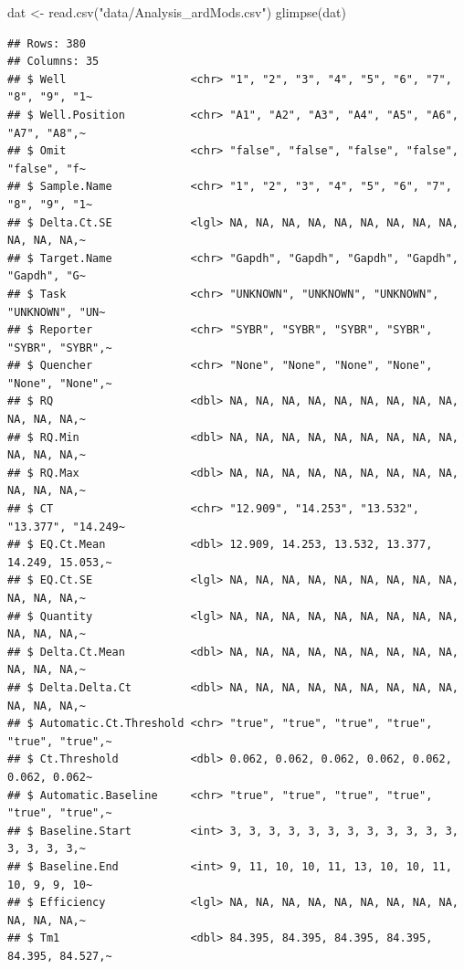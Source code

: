 \documentclass[
]{book}
\newenvironment{Shaded}{\begin{snugshade}}{\end{snugshade}}
\newcommand{\FunctionTok}[1]{\textcolor[rgb]{0.00,0.00,0.00}{#1}}
\newcommand{\NormalTok}[1]{#1}
\newcommand{\OtherTok}[1]{\textcolor[rgb]{0.56,0.35,0.01}{#1}}
\newcommand{\StringTok}[1]{\textcolor[rgb]{0.31,0.60,0.02}{#1}}
\begin{document}
\begin{Shaded}
\begin{Highlighting}[]
\NormalTok{dat }\OtherTok{\textless{}{-}} \FunctionTok{read.csv}\NormalTok{(}\StringTok{"data/Analysis\_ardMods.csv"}\NormalTok{)}
\FunctionTok{glimpse}\NormalTok{(dat)}
\end{Highlighting}
\end{Shaded}

\begin{verbatim}
## Rows: 380
## Columns: 35
## $ Well                   <chr> "1", "2", "3", "4", "5", "6", "7", "8", "9", "1~
## $ Well.Position          <chr> "A1", "A2", "A3", "A4", "A5", "A6", "A7", "A8",~
## $ Omit                   <chr> "false", "false", "false", "false", "false", "f~
## $ Sample.Name            <chr> "1", "2", "3", "4", "5", "6", "7", "8", "9", "1~
## $ Delta.Ct.SE            <lgl> NA, NA, NA, NA, NA, NA, NA, NA, NA, NA, NA, NA,~
## $ Target.Name            <chr> "Gapdh", "Gapdh", "Gapdh", "Gapdh", "Gapdh", "G~
## $ Task                   <chr> "UNKNOWN", "UNKNOWN", "UNKNOWN", "UNKNOWN", "UN~
## $ Reporter               <chr> "SYBR", "SYBR", "SYBR", "SYBR", "SYBR", "SYBR",~
## $ Quencher               <chr> "None", "None", "None", "None", "None", "None",~
## $ RQ                     <dbl> NA, NA, NA, NA, NA, NA, NA, NA, NA, NA, NA, NA,~
## $ RQ.Min                 <dbl> NA, NA, NA, NA, NA, NA, NA, NA, NA, NA, NA, NA,~
## $ RQ.Max                 <dbl> NA, NA, NA, NA, NA, NA, NA, NA, NA, NA, NA, NA,~
## $ CT                     <chr> "12.909", "14.253", "13.532", "13.377", "14.249~
## $ EQ.Ct.Mean             <dbl> 12.909, 14.253, 13.532, 13.377, 14.249, 15.053,~
## $ EQ.Ct.SE               <lgl> NA, NA, NA, NA, NA, NA, NA, NA, NA, NA, NA, NA,~
## $ Quantity               <lgl> NA, NA, NA, NA, NA, NA, NA, NA, NA, NA, NA, NA,~
## $ Delta.Ct.Mean          <dbl> NA, NA, NA, NA, NA, NA, NA, NA, NA, NA, NA, NA,~
## $ Delta.Delta.Ct         <dbl> NA, NA, NA, NA, NA, NA, NA, NA, NA, NA, NA, NA,~
## $ Automatic.Ct.Threshold <chr> "true", "true", "true", "true", "true", "true",~
## $ Ct.Threshold           <dbl> 0.062, 0.062, 0.062, 0.062, 0.062, 0.062, 0.062~
## $ Automatic.Baseline     <chr> "true", "true", "true", "true", "true", "true",~
## $ Baseline.Start         <int> 3, 3, 3, 3, 3, 3, 3, 3, 3, 3, 3, 3, 3, 3, 3, 3,~
## $ Baseline.End           <int> 9, 11, 10, 10, 11, 13, 10, 10, 11, 10, 9, 9, 10~
## $ Efficiency             <lgl> NA, NA, NA, NA, NA, NA, NA, NA, NA, NA, NA, NA,~
## $ Tm1                    <dbl> 84.395, 84.395, 84.395, 84.395, 84.395, 84.527,~

\end{verbatim}
\end{document}
